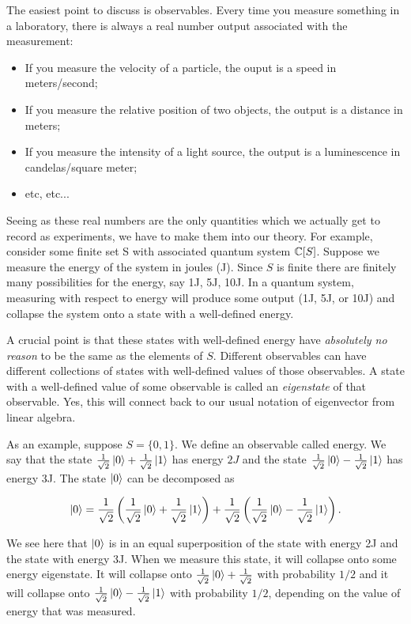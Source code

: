\documentclass{article}
\theoremstyle{definition}
\numberwithin{figure}{section}
\begin{document}
The easiest point to discuss is observables. Every time you measure something in a laboratory, there is always a real number output associated with the measurement:

\begin{itemize}
\item If you measure the velocity of a particle, the ouput is a speed in meters/second;
\item If you measure the relative position of two objects, the output is a distance in meters;
\item If you measure the intensity of a light source, the output is a luminescence in candelas/square meter;
\item etc, etc...
\end{itemize}

Seeing as these real numbers are the only quantities which we actually get to record as experiments, we have to make them into our theory. For example, consider some finite set S with associated quantum system $\mathbb{C}[S]$. Suppose we measure the energy of the system in joules (J). Since $S$ is finite there are finitely many possibilities for the energy, say 1J, 5J, 10J. In a quantum system, measuring with respect to energy will produce some output (1J, 5J, or 10J) and collapse the system onto a state with a well-defined energy.

A crucial point is that these states with well-defined energy have \textit{absolutely no reason} to be the same as the elements of $S$. Different observables can have different collections of states with well-defined values of those observables. A state with a well-defined value of some observable is called an \textit{eigenstate} of that observable. Yes, this will connect back to our usual notation of eigenvector from linear algebra.

As an example, suppose $S=\{0,1\}$. We define an observable called energy. We say that the state $\frac{1}{\sqrt{2}}\left|0\right>+\frac{1}{\sqrt{2}}\left|1\right>$ has energy $2J$ and the state $\frac{1}{\sqrt{2}}\left|0\right>-\frac{1}{\sqrt{2}}\left|1\right>$ has energy 3J. The state $\left|0\right>$ can be decomposed as

$$\left|0\right>=\frac{1}{\sqrt{2}}\left(\frac{1}{\sqrt{2}}\left|0\right>+\frac{1}{\sqrt{2}}\left|1\right>\right)+\frac{1}{\sqrt{2}}\left(\frac{1}{\sqrt{2}}\left|0\right>-\frac{1}{\sqrt{2}}\left|1\right>\right).$$

We see here that $\left|0\right>$ is in an equal superposition of the state with energy 2J and the state with energy 3J. When we measure this state, it will collapse onto some energy eigenstate. It will collapse onto $\frac{1}{\sqrt{2}}\left|0\right>+\frac{1}{\sqrt{2}}$ with probability $1/2$ and it will collapse onto $\frac{1}{\sqrt{2}}\left|0\right>-\frac{1}{\sqrt{2}}\left|1\right>$ with probability $1/2$, depending on the value of energy that was measured.
\end{document}
